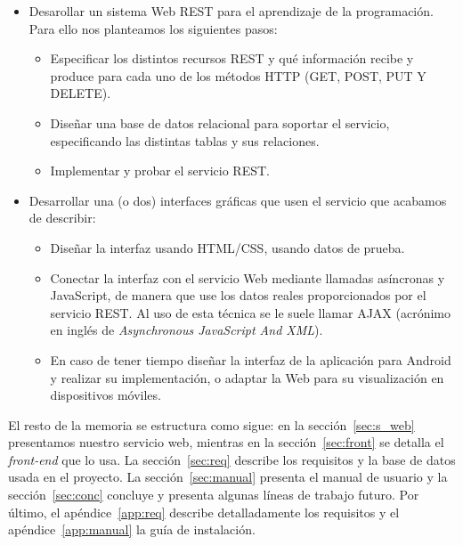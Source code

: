 \begin{itemize}
\item
Desarollar un sistema Web REST para el aprendizaje de la programación. Para ello nos planteamos los siguientes pasos:

\begin{itemize}
\item
Especificar los distintos recursos REST y qué información recibe y produce para cada uno de los métodos HTTP (GET, POST, PUT Y DELETE).

\item
Diseñar una base de datos relacional para soportar el servicio, especificando las distintas tablas y sus relaciones.

\item
Implementar y probar el servicio REST.

\end{itemize}

\item
Desarrollar una (o dos) interfaces gráficas que usen el servicio que acabamos de describir:

\begin{itemize}
\item
Diseñar la interfaz usando HTML/CSS, usando datos de prueba.

\item
Conectar la interfaz con el servicio Web mediante llamadas asíncronas y JavaScript, de manera que use los datos reales proporcionados por el servicio REST. Al uso de esta técnica se le suele llamar AJAX (acrónimo en inglés de  \emph{Asynchronous JavaScript And XML}).

\item
En caso de tener tiempo diseñar la interfaz de la aplicación para Android y realizar su implementación, o adaptar la Web para su visualización en dispositivos móviles.

\end{itemize}

\end{itemize}

El resto de la memoria se estructura como sigue: en la sección~\ref{sec:s_web} presentamos nuestro
servicio web, mientras en la sección~\ref{sec:front} se detalla el \emph{front-end} que lo usa.
La sección~\ref{sec:req} describe los requisitos y la base de datos usada en el proyecto. La
sección~\ref{sec:manual} presenta el manual de usuario y la sección~\ref{sec:conc} concluye y
presenta algunas líneas de trabajo futuro.
Por último, el apéndice~\ref{app:req} describe detalladamente los requisitos y el
apéndice~\ref{app:manual} la guía de instalación.

